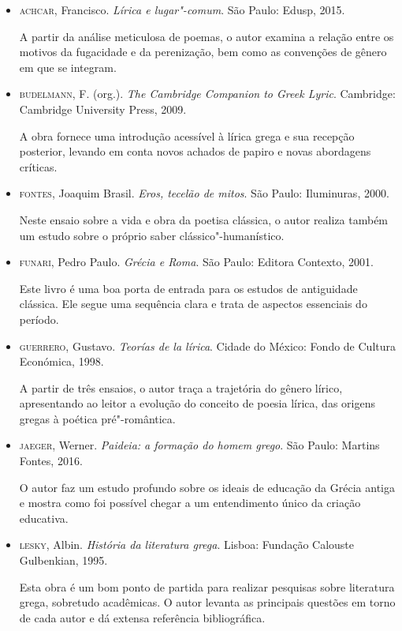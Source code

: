 \documentclass[12pt]{extarticle}
\begin{document}
\begin{itemize}
\item \textsc{achcar}, Francisco. \emph{Lírica e lugar"-comum}. São Paulo: Edusp,
2015.

A partir da análise meticulosa de poemas, o autor examina a relação
entre os motivos da fugacidade e da perenização, bem como as convenções
de gênero em que se integram.

\item \textsc{budelmann}, F. (org.). \emph{The Cambridge Companion to Greek Lyric}.
Cambridge: Cambridge University Press, 2009.

A obra fornece uma introdução acessível à lírica grega e sua recepção
posterior, levando em conta novos achados de papiro e novas abordagens
críticas.

\item \textsc{fontes}, Joaquim Brasil. \emph{Eros, tecelão de mitos}. São Paulo:
Iluminuras, 2000.

Neste ensaio sobre a vida e obra da poetisa clássica, o autor realiza
também um estudo sobre o próprio saber clássico"-humanístico.

\item \textsc{funari}, Pedro Paulo. \emph{Grécia e Roma}. São Paulo: Editora Contexto,
2001.

Este livro é uma boa porta de entrada para os estudos de antiguidade
clássica. Ele segue uma sequência clara e trata de aspectos essenciais
do período.

\item \textsc{guerrero}, Gustavo. \emph{Teorías de la lírica}. Cidade do México: Fondo
de Cultura Económica, 1998.

A partir de três ensaios, o autor traça a trajetória do gênero lírico,
apresentando ao leitor a evolução do conceito de poesia lírica, das
origens gregas à poética pré"-romântica.

\item \textsc{jaeger}, Werner. \emph{Paideia: a formação do homem grego}. São Paulo:
Martins Fontes, 2016.

O autor faz um estudo profundo sobre os ideais de educação da Grécia
antiga e mostra como foi possível chegar a um entendimento único da
criação educativa.

\item \textsc{lesky}, Albin. \emph{História da literatura grega}. Lisboa: Fundação
Calouste Gulbenkian, 1995.

Esta obra é um bom ponto de partida para realizar pesquisas sobre
literatura grega, sobretudo acadêmicas. O autor levanta as principais
questões em torno de cada autor e dá extensa referência bibliográfica.


\end{itemize}
\end{document}
